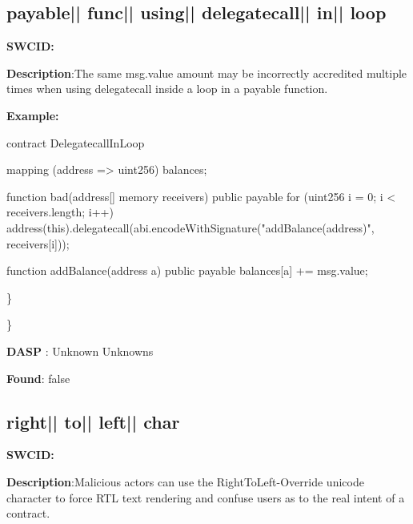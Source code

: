 \documentclass{article}
\begin{document}
\subsection{payable{|\textunderscore| }func{|\textunderscore| }using{|\textunderscore| }delegatecall{|\textunderscore| }in{|\textunderscore| }loop} 
\textbf{SWC{\textunderscore }ID:} 

\textbf{Description}:The same msg.value amount may be incorrectly accredited multiple times when using delegatecall inside a loop in a payable function.


\textbf{Example:} 
\begin{ffcode} 

contract DelegatecallInLoop{

    mapping (address => uint256) balances;

    function bad(address[] memory receivers) public payable {
        for (uint256 i = 0; i < receivers.length; i++) {
            address(this).delegatecall(abi.encodeWithSignature("addBalance(address)", receivers[i]));
        }
    }

    function addBalance(address a) public payable {
        balances[a] += msg.value;
    }
}

\end{ffcode} 
\} 

\} 

\textbf{DASP} : Unknown Unknowns

\textbf{Found}: false

\subsection{right{|\textunderscore| }to{|\textunderscore| }left{|\textunderscore| }char} 
\textbf{SWC{\textunderscore }ID:} 

\textbf{Description}:Malicious actors can use the Right{\textendash}To{\textendash}Left-Override unicode character to force RTL text rendering and confuse users as to the real intent of a contract.
\end{document}
